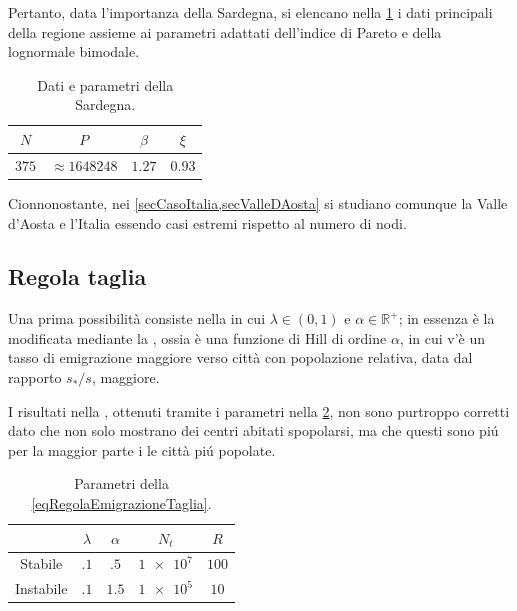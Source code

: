         Pertanto, data l'importanza della Sardegna, si elencano nella \cref{tabDatiParametriSardegna} i dati principali della regione assieme ai parametri adattati dell'indice di Pareto e della lognormale bimodale.

        \begin{table}[htb]
            \centering
            \begin{tabular}{cccc}
                \hline
                \(N\)&\(P\)&\(\beta\)&\(\xi\)\\
                \hline
                \(\num{375}\)&\(\approx\num{1648248}\)&\(\num{1.27}\)&\(\num{0.93}\)\\
                \hline
            \end{tabular}
            \caption{Dati e parametri della Sardegna.}
            \label{tabDatiParametriSardegna}
        \end{table}

        Cionnonostante, nei \cref{secCasoItalia,secValleDAosta} si studiano comunque la Valle d'Aosta e l'Italia essendo casi estremi rispetto al numero di nodi.

        \subsection{Regola taglia}

            Una prima possibilità consiste nella
            in cui \(\lambda\in(0,1)\) e \(\alpha\in\mathbb R^+\); in essenza è la \cite[(2.2), § 2, p. 223]{Gualandi2019SDC} modificata mediante la \cite[(4.5), § 4, p. 228]{Gualandi2019SDC}, ossia è una funzione di Hill di ordine \(\alpha\), in cui v'è un tasso di emigrazione maggiore verso città con popolazione relativa, data dal rapporto \(s_*/s\), maggiore.

            I risultati nella \daRivedere{}, ottenuti tramite i parametri nella \cref{tabParametriRegolaEmigrazioneTaglia}, non sono purtroppo corretti dato che non solo mostrano dei centri abitati spopolarsi, ma che questi sono piú per la maggior parte i le città piú popolate.

            \begin{table}[htb]
                \centering
                \begin{tabular}{ccccc}
                    \hline
                    &\(\lambda\)&\(\alpha\)&\(N_t\)&\(R\)\\
                    \hline
                    Stabile&\(\num{.1}\)&\(\num{.5}\)&\(\num{1e7}\)&\(\num{100}\)\\
                    Instabile&\(\num{.1}\)&\(\num{1.5}\)&\(\num{1e5}\)&\(\num{10}\)\\
                    \hline
                \end{tabular}
                \caption{Parametri della \ref{eqRegolaEmigrazioneTaglia}.}
                \label{tabParametriRegolaEmigrazioneTaglia}
            \end{table}

